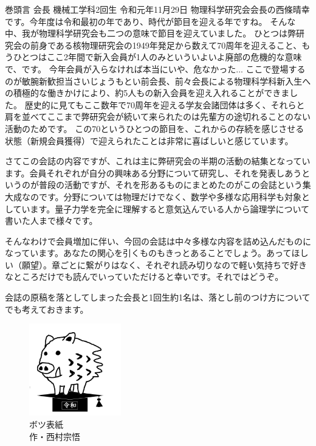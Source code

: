 \documentclass[10pt,b5paper,papersize,dvipdfmx]{jsbook}
\begin{document}
\begin{preface}{巻頭言}
        {会長}%
        {機械工学科2回生}%
        {}%
        {令和元年11月29日}%
物理科学研究会会長の西條晴幸です。今年度は令和最初の年であり、時代が節目を迎える年ですね。
そんな中、我が物理科学研究会も二つの意味で節目を迎えていました。
ひとつは弊研究会の前身である核物理研究会の1949年発足から数えて70周年を迎えること、もうひとつはここ2年間で新入会員が1人のみといういよいよ廃部の危機的な意味で、です。
今年会員が入らなければ本当にいや、危なかった...
ここで登場するのが敏腕新歓担当さいじょうもとい前会長、前々会長による物理科学科新入生への積極的な働きかけにより、約5人もの新入会員を迎え入れることができました。
歴史的に見てもここ数年で70周年を迎える学友会諸団体は多く、それらと肩を並べてここまで弊研究会が続いて来られたのは先輩方の途切れることのない活動のためです。
この70というひとつの節目を、これからの存続を感じさせる状態（新規会員獲得）で迎えられたことは非常に喜ばしいと感じています。\par
さてこの会誌の内容ですが、これは主に弊研究会の半期の活動の結集となっています。会員それぞれが自分の興味ある分野について研究し、それを発表しあうというのが普段の活動ですが、それを形あるものにまとめたのがこの会誌という集大成なのです。分野については物理だけでなく、数学や多様な応用科学も対象としています。量子力学を完全に理解すると意気込んでいる人から論理学について書いた人まで様々です。\par
そんなわけで会員増加に伴い、今回の会誌は中々多様な内容を詰め込んだものになっています。あなたの関心を引くものもきっとあることでしょう。あってほしい（願望）。章ごとに繋がりはなく、それぞれ読み切りなので軽い気持ちで好きなところだけでも読んでいっていただけると幸いです。それではどうぞ。\par
会誌の原稿を落としてしまった会長と1回生約1名は、落とし前のつけ方についてでも考えておきます。
\end{preface}


\clearpage
\quad\vfill
\begin{figure}[htb]
  \centering
  \includegraphics[width=40mm]{img/inoshishi.png}
  \caption*{
    \setlength{\baselineskip}{1.2zw}\gtfamily
    ボツ表紙 \\ 作・西村宗悟
  }
\end{figure}
\vfill
\end{document}
